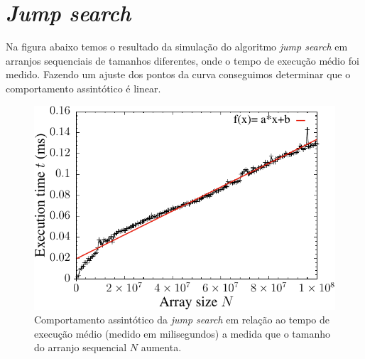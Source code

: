 \section{{\it Jump search}}

Na figura abaixo temos o resultado da simulação do algoritmo {\it jump search} em arranjos sequenciais de tamanhos diferentes, onde o tempo de execução médio foi medido. Fazendo um ajuste dos pontos da curva conseguimos determinar que o comportamento assintótico é linear.
\begin{figure}[H]
  \centering
  \includegraphics[scale=1.2]{../plots/jumpsearch_time.pdf}
  \caption{Comportamento assintótico da {\it jump search} em relação ao tempo de execução médio (medido em milisegundos) a medida que o tamanho do arranjo sequencial $N$ aumenta.}
  \label{fig:jumpsearch_time}
\end{figure} 

